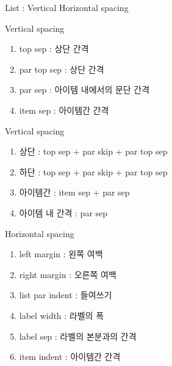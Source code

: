 \documentclass[ aspectratio=149,  14pt,blue,xcolor=pdftex,dvipsnames,table,handout,notes]{beamer}
\begin{document}

		\begin{frame}[c]{List : Vertical Horizontal spacing}

			\begin{block} {Vertical spacing}
			\begin{enumerate}
			\item	top sep		: 상단 간격
			\item	par top sep	: 상단 간격
			\item	par sep		: 아이템 내에서의 문단 간격
			\item	item sep		: 아이템간 간격
			\end{enumerate}
			\end{block}

			\begin{block} {Vertical spacing}
			\begin{enumerate}
			\item	상단		: top sep + par skip + par top sep
			\item	하단		: top sep + par skip + par top sep
			\item	아이템간	: item sep + par sep
 			\item	아이템 내 간격	: par sep
			\end{enumerate}
			\end{block}


			\begin{block} {Horizontal spacing}
			\begin{enumerate}
			\item	left margin		: 왼쪽 여백
			\item	right margin		: 오른쪽 여백
			\item	list par indent	: 들여쓰기
			\item	label width		: 라벨의 폭
			\item	label sep			: 라벨의 본분과의 간격
			\item	item indent		: 아이템간 간격
			\end{enumerate}
			\end{block}

		
		\end{frame}
\end{document}
